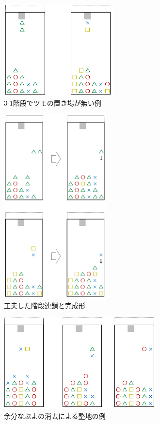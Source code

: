 \documentclass[12pt]{jreport}
\begin{document}
\begin{figure}[tbp]
  \begin{center}
  \includegraphics[height=5cm]{img/kaidan_ng.png}
  \caption{3-1階段でツモの置き場が無い例} \label{fig:kaidan_ng}
\end{center}
\end{figure}

\begin{figure}[tbp]
  \begin{center}
  \includegraphics[height=10cm]{img/kaidan_ok.png}
  \caption{工夫した階段連鎖と完成形} \label{fig:kaidan_ok}
\end{center}
\end{figure}

\begin{figure}[tbp]
  \begin{center}
  \includegraphics[height=5cm]{img/teikei_del.png}
  \caption{余分なぷよの消去による整地の例} \label{fig:teikei_del}
\end{center}
\end{figure}
\end{document}
